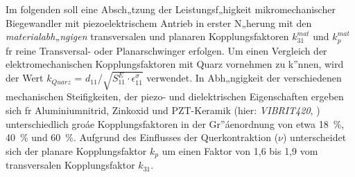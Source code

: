 %
Im folgenden soll eine Absch„tzung der Leistungsf„higkeit mikromechanischer
Biegewandler mit piezoelektrischem Antrieb in erster N„herung
mit den {\em materialabh„ngigen} transversalen und planaren Kopplungsfaktoren
$k_{31}^{mat}$ und $k_{p}^{mat}$ fr reine Transversal- oder Planarschwinger
erfolgen. Um einen Vergleich der elektromechanischen Kopplungsfaktoren mit
Quarz vornehmen zu k”nnen, wird der Wert
$k_{Quarz}$ = $d_{11}$/$\sqrt{S^{E}_{11} \cdot \epsilon^{\sigma}_{11}}$
verwendet. In Abh„ngigkeit der
verschiedenen mechanischen Steifigkeiten, der piezo- und dielektrischen
Eigenschaften ergeben sich fr Aluminiumnitrid, Zinkoxid und PZT-Keramik
(hier: {\sl VIBRIT420}, \cite{Sie81}) unterschiedlich groáe
Kopplungsfaktoren in der Gr”áenordnung von etwa 18~\%, 40~\% und 60~\%.
Aufgrund des Einflusses
der Querkontraktion ($\nu$) unterscheidet sich der planare Kopplungsfaktor
$k_{p}$ um einen Faktor von 1,6 bis 1,9 vom transversalen Kopplungsfaktor
$k_{31}$.
